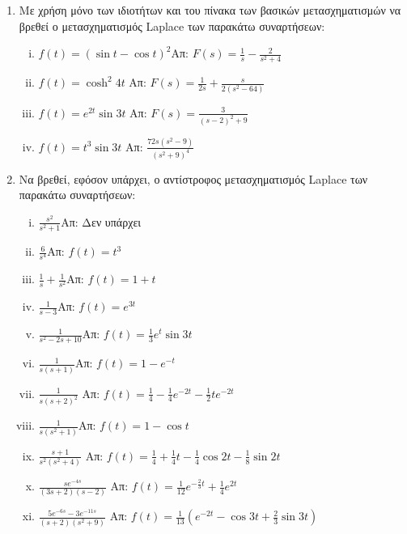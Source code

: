 


\geometry{left=15.63mm,right=15.63mm,top=28.25mm,bottom=34.25mm,footskip=24.16mm,headsep=24.16mm}

\pagestyle{askhseis}
\everymath{\displaystyle}



\begin{center}
  \minibox{\large\bfseries \textcolor{Col1}{Ασκήσεις στο Μετασχηματισμό Laplace}}
\end{center}

\vspace{\baselineskip}

\begin{enumerate}

  \item Με χρήση μόνο των ιδιοτήτων και του πίνακα των βασικών μετασχηματισμών να 
    βρεθεί ο μετασχηματισμός Laplace των παρακάτω συναρτήσεων:
    \begin{enumerate}[i)]
      \item $f(t)=(\sin t-\cos t)^2$\hfill Απ: $F(s)=\frac{1}{s}-\frac{2}{s^2+4}$
      \item $f(t)=\cosh^2 4t$ \hfill Απ: $F(s)=\frac{1}{2s}+\frac{s}{2(s^2-64)}$
      \item $f(t)=e^{2t}\sin 3t$ \hfill Απ: $F(s)=\frac{3}{(s-2)^2+9}$
      \item $f(t)=t^3\sin 3t$ \hfill Απ: $\frac{72s(s^2-9)}{(s^2+9)^4}$
    \end{enumerate}

  \item Να βρεθεί, εφόσον υπάρχει, ο αντίστροφος μετασχηματισμός Laplace των 
    παρακάτω συναρτήσεων:
    \begin{enumerate}[i)]
      \item $\frac{s^2}{s^2+1}$\hfill Απ: Δεν υπάρχει
      \item $\frac{6}{s^4}$\hfill Απ: $f(t)=t^3$
      \item $\frac{1}{s}+\frac{1}{s^2}$\hfill Απ: $f(t)=1+t$
      \item $\frac{1}{s-3}$\hfill Απ: $f(t)=e^{3t}$
      \item $\frac{1}{s^2-2s+10}$\hfill Απ: $f(t)=\frac{1}{3}e^t\sin 3t$
      \item $\frac{1}{s(s+1)}$\hfill Απ: $f(t)=1-e^{-t}$
      \item $\frac{1}{s(s+2)^2}$
        \hfill Απ: $f(t)=\frac{1}{4}-\frac{1}{4}e^{-2t}-\frac{1}{2}te^{-2t}$
      \item $\frac{1}{s(s^2+1)}$\hfill Απ: $f(t)=1-\cos t$
      \item $\frac{s+1}{s^{2}(s^{2}+4)}$ 
        \hfill Απ: $f(t)=\frac{1}{4}+\frac{1}{4}t-\frac{1}{4}\cos 2t -\frac{1}{8}\sin 2t$
      \item $\frac{se^{-4s}}{(3s+2)(s-2)}$ 
        \hfill Απ: $f(t)=\frac{1}{12}e^{-\frac{2}{3}t}+\frac{1}{4}e^{2t}$
      \item $\frac{5e^{-6s}-3e^{-11s}}{(s+2)(s^{2}+9)}$ 
        \hfill Απ: $f(t)=\frac{1}{13}(e^{-2t}-\cos 3t+\frac{2}{3}\sin 3t)$
    \end{enumerate}


\end{enumerate}
